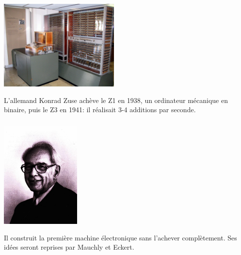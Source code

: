 \documentclass[svgnames,11pt]{beamer}
\begin{document}
\begin{frame}
    \frametitle{}

    \begin{center}
    \centering
    \includegraphics[width=6cm]{ressources/zuse.jpg}
    \end{center}
\begin{aretenir}[1938-1941]
    L’allemand Konrad Zuse achève le Z1 en 1938, un ordinateur mécanique en binaire, puis le Z3 en 1941: il réalisait 3-4 additions par seconde.
\end{aretenir}
\end{frame}
\begin{frame}
    \frametitle{}

    \begin{center}
    \centering
    \includegraphics[width=4cm]{ressources/atanasoff.jpg}
    \end{center}
\begin{aretenir}[1942]
    Il construit la première machine électronique sans l'achever complètement. Ses idées seront reprises par Mauchly et Eckert.
\end{aretenir}
\end{frame}
\end{document}
